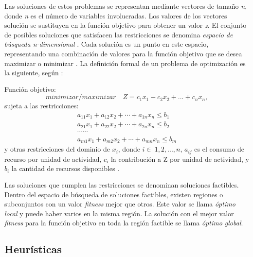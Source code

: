 Las soluciones de estos problemas se representan mediante vectores de tamaño \textit{n}, donde \textit{n} es el número de variables involucradas. Los valores de los vectores solución se sustituyen en la función objetivo para obtener un valor \textit{z}. El conjunto de posibles soluciones que satisfacen las restricciones se denomina \textit{espacio de búsqueda n-dimensional} \cite{10.5555/1718024}. Cada solución es un punto en este espacio, representando una combinación de valores para la función objetivo que se desea maximizar o minimizar \cite{investigacion-operaciones}. La definición formal de un problema de optimización es la siguiente, según \cite{investigacion-operaciones}:

Función objetivo:
\begin{equation}
minimizar/maximizar \quad Z = c_1 x_1 + c_2 x_2 + ... + c_n x_n,
\end{equation}
sujeta a las restricciones:
\begin{align*}
    a_{11} x_1 + a_{12} x_2 + \cdots + a_{1n} x_n \leq b_1 \\
    a_{21} x_1 + a_{22} x_2 + \cdots + a_{2n} x_n \leq b_2 \\
    \cdots \cdots \\
    a_{m1} x_1 + a_{m2} x_2 + \cdots + a_{mn} x_n \leq b_m
\end{align*}
\noindent
y otras restricciones del dominio de $x_i$, donde $i \in\ {1,2, ... ,n}$, $a_{ij}$ es el consumo de recurso por unidad de actividad, $c_{i}$ la contribución a Z por unidad de actividad, y $b_{i}$ la cantidad de recursos disponibles \cite{investigacion-operaciones}.

Las soluciones que cumplen las restricciones se denominan soluciones factibles. Dentro del espacio de búsqueda de soluciones factibles, existen regiones o subconjuntos con un valor \textit{fitness} mejor que otros. Este valor se llama \textit{óptimo local} y puede haber varios en la misma región. La solución con el mejor valor \textit{fitness} para la función objetivo en toda la región factible se llama \textit{óptimo global}.

\vspace{2mm}


\subsection{Heurísticas}

\vspace{1mm}
\normalsize

